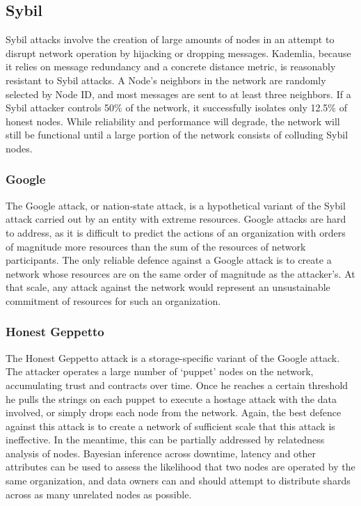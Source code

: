 \documentclass[a4paper,10pt]{article}
\begin{document}
\subsection{Sybil}

Sybil attacks involve the creation of large amounts of nodes in an attempt to disrupt network operation by hijacking or dropping messages. Kademlia, because it relies on message redundancy and a concrete distance metric, is reasonably resistant to Sybil attacks. A Node’s neighbors in the network are randomly selected by Node ID, and most messages are sent to at least three neighbors. If a Sybil attacker controls 50\% of the network, it successfully isolates only 12.5\% of honest nodes. While reliability and performance will degrade, the network will still be functional until a large portion of the network consists of colluding Sybil nodes.

\subsubsection{Google}
The Google attack, or nation-state attack, is a hypothetical variant of the Sybil attack carried out by an entity with extreme resources. Google attacks are hard to address, as it is difficult to predict the actions of an organization with orders of magnitude more resources than the sum of the resources of network participants. The only reliable defence against a Google attack is to create a network whose resources are on the same order of magnitude as the attacker’s. At that scale, any attack against the network would represent an unsustainable commitment of resources for such an organization.

\subsubsection{Honest Geppetto}
The Honest Geppetto attack is a storage-specific variant of the Google attack. The attacker operates a large number of ‘puppet’ nodes on the network, accumulating trust and contracts over time. Once he reaches a certain threshold he pulls the strings on each puppet to execute a hostage attack with the data involved, or simply drops each node from the network. Again, the best defence against this attack is to create a network of sufficient scale that this attack is ineffective. In the meantime, this can be partially addressed by relatedness analysis of nodes. Bayesian inference across downtime, latency and other attributes can be used to assess the likelihood that two nodes are operated by the same organization, and data owners can and should attempt to distribute shards across as many unrelated nodes as possible.
\end{document}
